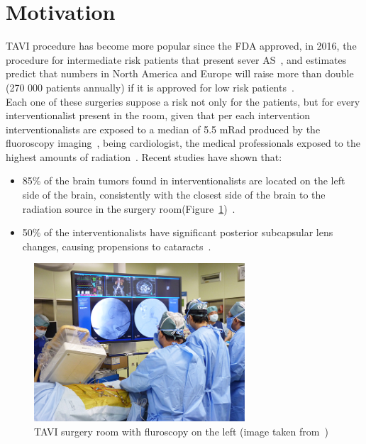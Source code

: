 \section{Motivation}\label{sec:motivation}

TAVI procedure has become more popular since the FDA approved, in 2016, the procedure for intermediate risk patients that present sever AS~\cite{tavi2019}, and estimates predict that numbers in North America and Europe will raise more than double (270 000 patients annually) if it is approved for low risk patients~\cite{taviprojection}.\\

Each one of these surgeries suppose a risk not only for the patients, but for every interventionalist present in the room, given that per each intervention interventionalists are exposed to a median of 5.5 mRad produced by the fluoroscopy imaging~\cite{taviradiation}, being cardiologist, the medical professionals exposed to the highest amounts of radiation~\cite{tavibrain}. Recent studies have shown that:
\begin{itemize}
 \item 	85\% of the brain tumors found in interventionalists are located on the left side of the brain, consistently with the closest side of the brain to the radiation source in the surgery room(Figure~\ref{img:operationroom})~\cite{tavibrain}.
 \item 	50\% of the interventionalists have significant posterior subcapsular lens changes, causing propensions to cataracts~\cite{tavilens}.\\
\end{itemize}

\begin{figure}[ht]
   \centering
   \includegraphics[width=0.7\textwidth]{img/operationroom.PNG}
   \caption{TAVI surgery room with fluroscopy on the left (image taken from~\protect\cite{taviroom})}
   \label{img:operationroom}
\end{figure}

